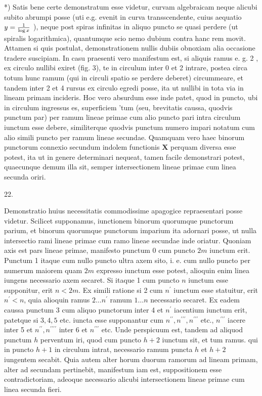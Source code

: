 \documentclass[twoside,12pt, showframe]{memoir}
\let\oldfrac\frac
\def\frac#1#2{\mathchoice{\tfrac{#1}{#2}}{\oldfrac{#1}{#2}}{\genfrac{}{}{}{2}{#1}{#2\mathstrut}}{\genfrac{}{}{}{3}{#1}{#2\mathstrut}}}
\begin{document}
*) Satis bene certe demonstratum esse videtur, curvam algebraicam neque alicubi subito abrumpi posse (uti e.g. evenit in curva transscendente, cuius aequatio \(y=\frac{1}{\log x}\) ), neque post spiras infinitas in aliquo puncto se quasi perdere (ut spiralis logarithmica), quantumque scio nemo dubium contra hanc rem movit. Attamen si quis postulat, demonstrationem nullis dubiis obnoxiam alia occasione tradere suscipiam. In casu praesenti vero manifestum est, si aliquis ramus e. g. 2 , ex circulo nullibi exiret (fig. 3), te in circulum inter 0 et 2 intrare, postea circa totum hunc ramum (qui in circuli spatio se perdere deberet) circummeare, et tandem inter 2 et 4 rursus ex circulo egredi posse, ita ut nullibi in tota via in lineam primam incideris. Hoc vero absurdum esse inde patet, quod in puncto, ubi in circulum ingressus es, superficiem
'tum (seu, brevitatis caussa, quodvis punctum par) per ramum lineae primae cum alio puncto pari intra circulum iunctum esse debere, similiterque quodvis punctum numero impari notatum cum alio simili puncto per ramum lineae secundae. Quamquam vero haec binorum punctorum connexio secundum indolem functionis \(\boldsymbol{X}\) perquam diversa esse potest, ita ut in genere determinari nequeat, tamen facile demonstrari potest, quaecunque demum illa sit, semper intersectionem lineae primae cum linea secunda oriri.

22.

Demonstratio huius necessitatis commodissime apagogice repraesentari posse videtur. Scilicet supponamus, iunctionem binorum quorumque punctorum parium, et binorum quorumque punctorum imparium ita adornari posse, ut nulla intersectio rami lineae primae cum ramo lineae secundae inde oriatur. Quoniam axis est pars lineae primae, manifesto punctum 0 cum puncto \(2 m\) iunctum erit. Punctum 1 itaque cum nullo puncto ultra axem sito, i. e. cum nullo puncto per numerum maiorem quam \(2 m\) expresso iunctum esse potest, alioquin enim linea iungens necessario axem secaret. Si itaque 1 cum puncto \(n\) iunctum esse supponitur, erit \(n<2 m\). Ex simili ratione si 2 cum \(n^{\prime}\) iunctum esse statuitur, erit \(n^{\prime}<n\), quia alioquin ramus \(2 \ldots n^{\prime}\) ramum \(1 \ldots n\) necessario secaret. Ex eadem caussa punctum 3 cum aliquo punctorum inter 4 et \(n^{\prime}\) iacentium iunctum erit, patetque si \(3,4,5\) etc. iuncta esse supponantur cum \(n^{\prime \prime}, n^{\prime \prime \prime}, n^{\prime \prime \prime}\) etc., \(n^{\prime \prime \prime}\) iacere inter 5 et \(n^{\prime \prime}, n^{\prime \prime \prime \prime}\) inter 6 et \(n^{\prime \prime \prime}\) etc. Unde perspicuum est, tandem ad aliquod punctum \(h\) perventum iri, quod cum puncto \(h+2\) iunctum sit, et tum ramus. qui in puncto \(h+1\) in circulum intrat, necessario ramum puncta \(h\) et \(h+2\) iungentem secabit. Quia autem alter horum duorum ramorum ad lineam primam, alter ad secundam pertinebit, manifestum iam est, suppositionem esse contradictoriam, adeoque necessario alicubi intersectionem lineae primae cum linea secunda fieri.
\end{document}

